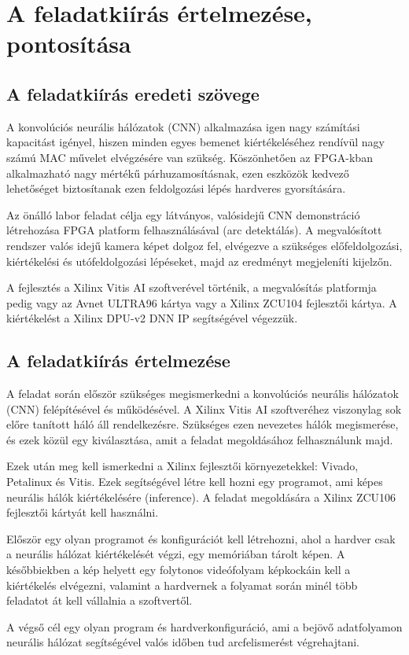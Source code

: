 \chapter{A feladatkiírás értelmezése, pontosítása}

\section{A feladatkiírás eredeti szövege}

A konvolúciós neurális hálózatok (CNN) alkalmazása igen nagy számítási kapacitást igényel, hiszen minden egyes bemenet kiértékeléséhez rendívül nagy számú MAC művelet elvégzésére van szükség. Köszönhetően az FPGA-kban alkalmazható nagy mértékű párhuzamosításnak, ezen eszközök kedvező lehetőséget biztosítanak ezen feldolgozási lépés hardveres gyorsítására.

Az önálló labor feladat célja egy látványos, valósidejű CNN demonstráció létrehozása FPGA platform felhasználásával (arc detektálás). A megvalósított rendszer valós idejű kamera képet dolgoz fel, elvégezve a szükséges előfeldolgozási, kiértékelési és utófeldolgozási lépéseket, majd az eredményt megjeleníti kijelzőn.

A fejlesztés a Xilinx Vitis AI szoftverével történik, a megvalósítás platformja pedig vagy az Avnet ULTRA96 kártya vagy a Xilinx ZCU104 fejlesztői kártya. A kiértékelést a Xilinx DPU-v2 DNN IP segítségével végezzük.

\section{A feladatkiírás értelmezése}

A feladat során először szükséges megismerkedni a konvolúciós neurális hálózatok (CNN) felépítésével és működésével. A Xilinx Vitis AI szoftveréhez viszonylag sok előre tanított háló áll rendelkezésre. Szükséges ezen nevezetes hálók megismerése, és ezek közül egy kiválasztása, amit a feladat megoldásához felhasználunk majd.

Ezek után meg kell ismerkedni a Xilinx fejlesztői környezetekkel: Vivado, Petalinux és Vitis. Ezek segítségével létre kell hozni egy programot, ami képes neurális hálók kiértékelésére (inference). A feladat megoldására a Xilinx ZCU106 fejlesztői kártyát kell használni.

Először egy olyan programot és konfigurációt kell létrehozni, ahol a hardver csak a neurális hálózat kiértékelését végzi, egy memóriában tárolt képen. A későbbiekben a kép helyett egy folytonos videófolyam képkockáin kell a kiértékelés elvégezni, valamint a hardvernek a folyamat során minél több feladatot át kell vállalnia a szoftvertől.

A végső cél egy olyan program és hardverkonfiguráció, ami a bejövő adatfolyamon neurális hálózat segítségével valós időben tud arcfelismerést végrehajtani.
